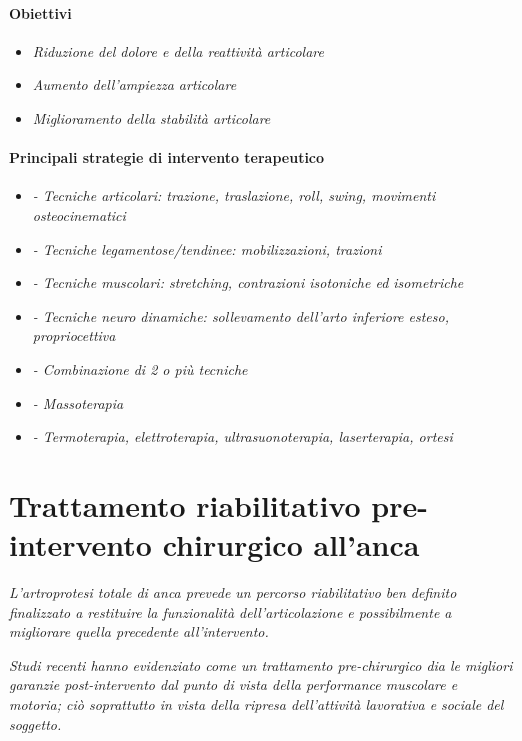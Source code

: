 \paragraph{Obiettivi}



\begin{itemize}
\item
  \emph{Riduzione del dolore e della reattività articolare}
\item
  
  \emph{Aumento dell'ampiezza articolare}
  
\item
  \emph{Miglioramento della stabilità articolare }
\end{itemize}
\paragraph{Principali strategie di intervento terapeutico}

\begin{itemize}
\item 
\emph{- Tecniche articolari: trazione, traslazione, roll, swing,
movimenti osteocinematici}
\item 
\emph{- Tecniche legamentose/tendinee: mobilizzazioni, trazioni}
\item 
\emph{- Tecniche muscolari: stretching, contrazioni isotoniche ed
isometriche}
\item 
\emph{- Tecniche neuro dinamiche: sollevamento dell'arto inferiore
esteso, propriocettiva}
\item 
\emph{- Combinazione di 2 o più tecniche}
\item 
\emph{- Massoterapia}

\item 
\emph{- Termoterapia, elettroterapia, ultrasuonoterapia, laserterapia,
ortesi}
\end{itemize}
\section{Trattamento riabilitativo pre-intervento chirurgico all'anca}

\emph{L'artroprotesi totale di anca prevede un percorso riabilitativo
ben definito finalizzato a restituire la funzionalità dell'articolazione
e possibilmente a migliorare quella precedente all'intervento.}

\emph{Studi recenti hanno evidenziato come un trattamento pre-chirurgico
dia le migliori garanzie post-intervento dal punto di vista della
performance muscolare e motoria; ciò soprattutto in vista della ripresa
dell'attività lavorativa e sociale del soggetto.}

